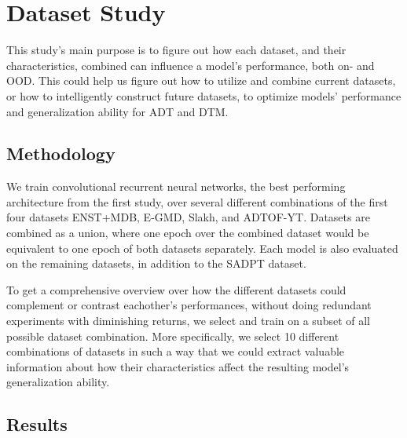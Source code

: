 \chapter{Dataset Study}

This study's main purpose is to figure out how each dataset, and their characteristics, combined can influence a model's performance, both on- and \gls{OOD}. This could help us figure out how to utilize and combine current datasets, or how to intelligently construct future datasets, to optimize models' performance and generalization ability for \acrfull{ADT} and \acrfull{DTM}.

\section{Methodology}

We train convolutional recurrent neural networks, the best performing architecture from the first study, over several different combinations of the first four datasets ENST+MDB, E-GMD, Slakh, and ADTOF-YT. Datasets are combined as a union, where one epoch over the combined dataset would be equivalent to one epoch of both datasets separately. Each model is also evaluated on the remaining datasets, in addition to the SADPT dataset.

To get a comprehensive overview over how the different datasets could complement or contrast eachother's performances, without doing redundant experiments with diminishing returns, we select and train on a subset of all possible dataset combination. More specifically, we select 10 different combinations of datasets in such a way that we could extract valuable information about how their characteristics affect the resulting model's generalization ability.

\section{Results}

